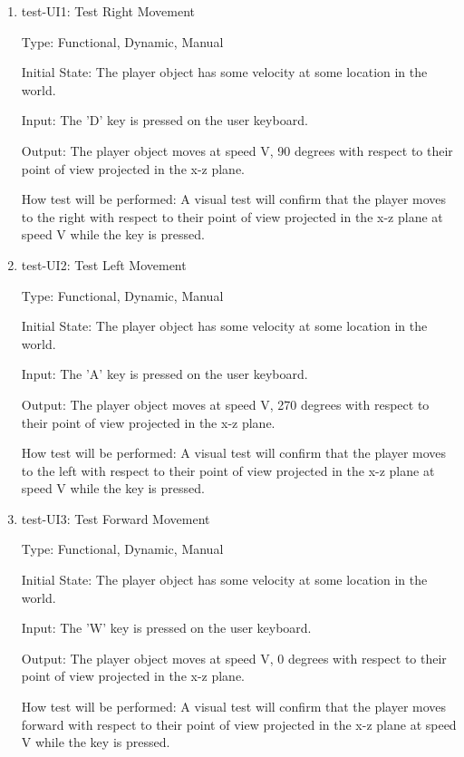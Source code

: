 \documentclass[12pt, titlepage]{article}
\begin{document}
\begin{enumerate}
\item{test-UI1: Test Right Movement \\}

Type: Functional, Dynamic, Manual
					
Initial State: The player object has some velocity at some location in the world.
					
Input: The 'D' key is pressed on the user keyboard.
					
Output: The player object moves at speed V, 90 degrees with respect to their point of view projected in the x-z plane.
					
How test will be performed: A visual test will confirm that the player moves to the right with respect to their point of view projected in the x-z plane at speed V while the key is pressed.
					
\item{test-UI2: Test Left Movement\\}

Type: Functional, Dynamic, Manual
					
Initial State: The player object has some velocity at some location in the world.
					
Input: The 'A' key is pressed on the user keyboard.
					
Output: The player object moves at speed V, 270 degrees with respect to their point of view projected in the x-z plane.
					
How test will be performed: A visual test will confirm that the player moves to the left with respect to their point of view projected in the x-z plane at speed V while the key is pressed.

\item{test-UI3: Test Forward Movement\\}

Type: Functional, Dynamic, Manual
					
Initial State: The player object has some velocity at some location in the world.
					
Input: The 'W' key is pressed on the user keyboard.
					
Output: The player object moves at speed V, 0 degrees with respect to their point of view projected in the x-z plane.
					
How test will be performed: A visual test will confirm that the player moves forward with respect to their point of view projected in the x-z plane at speed V while the key is pressed.



\end{enumerate}
\end{document}
